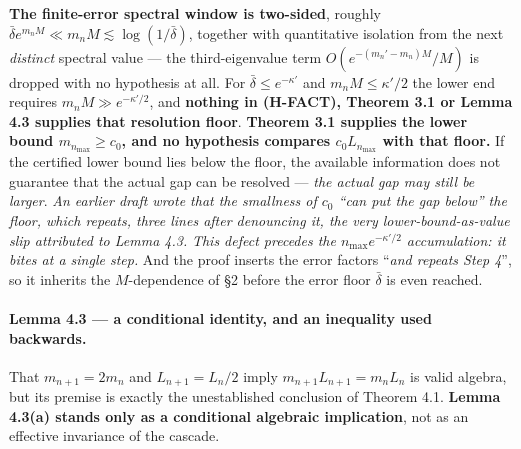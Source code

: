 \documentclass[11pt]{article}
\begin{document}
\textbf{The finite-error spectral window is two-sided}, roughly
$\bar\delta e^{m_nM}\ll m_nM\lesssim\log(1/\bar\delta)$, together with quantitative
isolation from the next \emph{distinct} spectral value --- the third-eigenvalue term
$O(e^{-(m_n'-m_n)M}/M)$ is dropped with no hypothesis at all. For
$\bar\delta\le e^{-\kappa'}$ and $m_nM\le\kappa'/2$ the lower end requires
$m_nM\gg e^{-\kappa'/2}$, and \textbf{nothing in (H-FACT), Theorem 3.1 or Lemma 4.3
supplies that resolution floor}. \textbf{Theorem 3.1 supplies the lower bound
$m_{n_{\max}}\ge c_0$, and no hypothesis compares $c_0L_{n_{\max}}$ with that floor.}
If the certified lower bound lies below the floor, the available information does
not guarantee that the actual gap can be resolved --- \emph{the actual gap may still
be larger}. \emph{An earlier draft wrote that the smallness of $c_0$ ``can put the
gap below'' the floor, which repeats, three lines after denouncing it, the very
lower-bound-as-value slip attributed to Lemma 4.3.} \emph{This defect precedes the
$n_{\max}e^{-\kappa'/2}$ accumulation: it bites at a single step.} And the proof
inserts the error factors
``\emph{and repeats Step 4}'', so it inherits the $M$-dependence of \S2 before the
error floor $\bar\delta$ is even reached.

\paragraph{Lemma 4.3 --- a conditional identity, and an inequality used backwards.}
That $m_{n+1}=2m_n$ and $L_{n+1}=L_n/2$ imply $m_{n+1}L_{n+1}=m_nL_n$ is valid
algebra, but its premise is exactly the unestablished conclusion of Theorem 4.1.
\textbf{Lemma 4.3(a) stands only as a conditional algebraic implication}, not as an
effective invariance of the cascade.
\end{document}
